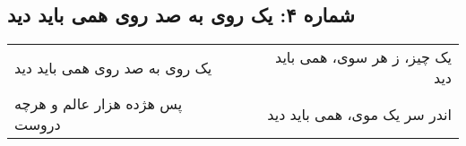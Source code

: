 \begin{center}
\section*{شماره ۴: یک روی به صد روی همی باید دید}
\label{sec:004}
\begin{longtable}{l p{0.5cm} r}
یک روی به صد روی همی باید دید
&&
یک چیز، ز هر سوی، همی باید دید
\\
پس هژده هزار عالم و هرچه دروست
&&
اندر سر یک موی، همی باید دید
\\
\end{longtable}
\end{center}

